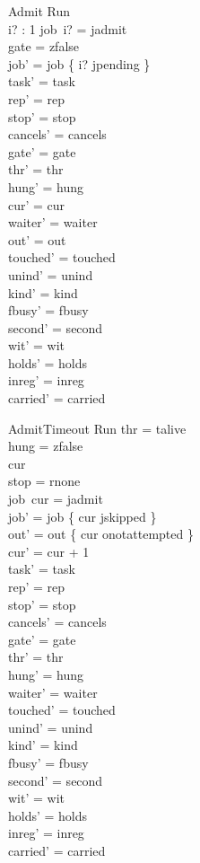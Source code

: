 \documentclass[a4paper,10pt,fleqn]{article}
\begin{document}
\begin{schema}{Admit}
\Delta Run \\ i? : 1 
\where
job~i? = jadmit \\
gate = zfalse \\
job' = job \oplus \{ i? \mapsto jpending \} \\
task' = task \\
rep' = rep \\
stop' = stop \\
cancels' = cancels \\
gate' = gate \\
thr' = thr \\
hung' = hung \\
cur' = cur \\
waiter' = waiter \\
out' = out \\
touched' = touched \\
unind' = unind \\
kind' = kind \\
fbusy' = fbusy \\
second' = second \\
wit' = wit \\
holds' = holds \\
inreg' = inreg \\
carried' = carried
\end{schema}

\begin{schema}{AdmitTimeout}
\Delta Run
\where
thr = talive \\
hung = zfalse \\
cur   \\
stop = rnone \\
job~cur = jadmit \\
job' = job \oplus \{ cur \mapsto jskipped \} \\
out' = out \oplus \{ cur \mapsto onotattempted \} \\
cur' = cur + 1 \\
task' = task \\
rep' = rep \\
stop' = stop \\
cancels' = cancels \\
gate' = gate \\
thr' = thr \\
hung' = hung \\
waiter' = waiter \\
touched' = touched \\
unind' = unind \\
kind' = kind \\
fbusy' = fbusy \\
second' = second \\
wit' = wit \\
holds' = holds \\
inreg' = inreg \\
carried' = carried
\end{schema}
\end{document}
